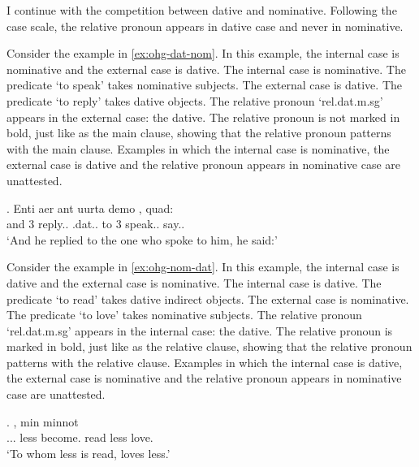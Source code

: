 I continue with the competition between dative and nominative. Following the case scale, the relative pronoun appears in dative case and never in nominative.

Consider the example in \ref{ex:ohg-dat-nom}. In this example, the internal case is nominative and the external case is dative.
The internal case is nominative. The predicate  `to speak' takes nominative subjects.
The external case is dative. The predicate  `to reply' takes dative objects.
The relative pronoun  `\ac{rel}.\ac{dat}.\ac{m}.\ac{sg}' appears in the external case: the dative. The relative pronoun is not marked in bold, just like as the main clause, showing that the relative pronoun patterns with the main clause.
Examples in which the internal case is nominative, the external case is dative and the relative pronoun appears in nominative case are unattested.

\exg. Enti aer {ant uurta} demo  , quad:\\
and 3 reply..\scsub{[dat]} .\ac{dat}.. {to 3} speak..\scsub{[nom]} say..\\
`And he replied to the one who spoke to him, he said:' \label{ex:ohg-dat-nom}

Consider the example in \ref{ex:ohg-nom-dat}. In this example, the internal case is dative and the external case is nominative.
The internal case is dative. The predicate  `to read' takes dative indirect objects.
The external case is nominative. The predicate  `to love' takes nominative subjects.
The relative pronoun  `\ac{rel}.\ac{dat}.\ac{m}.\ac{sg}' appears in the internal case: the dative. The relative pronoun is marked in bold, just like as the relative clause, showing that the relative pronoun patterns with the relative clause.
Examples in which the internal case is dative, the external case is nominative and the relative pronoun appears in nominative case are unattested.

\exg.    , min minnot\\
... less become. read\scsub{[dat]} less love.\scsub{[nom]}\\
`To whom less is read, loves less.' \label{ex:ohg-nom-dat}

